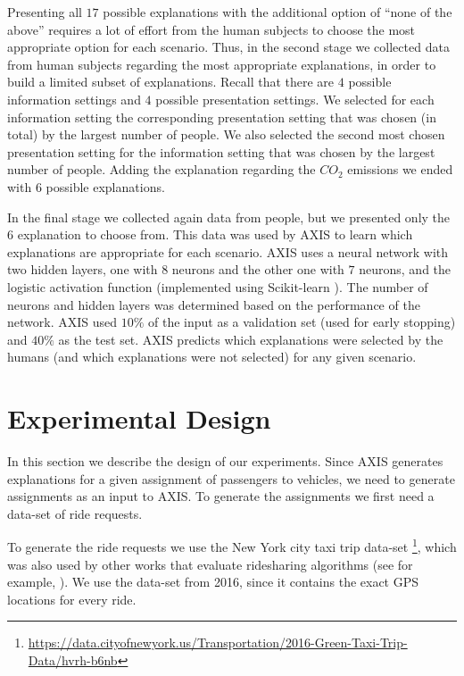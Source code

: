 \documentclass[letterpaper]{article} %
\begin{document}
Presenting all $17$ possible explanations with the additional option of ``none of the above'' requires a lot of effort from the human subjects to choose the most appropriate option for each scenario. Thus, in the second stage we collected data from human subjects regarding the most appropriate explanations, in order to build a limited subset of explanations. Recall that there are $4$ possible information settings and $4$ possible presentation settings. We selected for each information setting the corresponding presentation setting that was chosen (in total) by the largest number of people. We also selected the second most chosen presentation setting for the information setting that was chosen by the largest number of people. Adding the explanation regarding the $CO_2$ emissions we ended with $6$ possible explanations.

In the final stage we collected again data from people, but we presented only the $6$ explanation to choose from. This data was used by AXIS to learn which explanations are appropriate for each scenario. AXIS uses a neural network with two hidden layers, one with $8$ neurons and the other one with $7$ neurons, and the logistic activation function (implemented using Scikit-learn \cite{scikit-learn}). The number of neurons and hidden layers was determined based on the performance of the network.
AXIS used $10\%$ of the input as a validation set (used for early stopping) and $40\%$ as the test set. AXIS predicts which explanations were selected by the humans (and which explanations were not selected) for any given scenario.



\section{Experimental Design}
In this section we describe the design of our experiments. Since AXIS generates explanations for a given assignment of passengers to vehicles, we need to generate assignments as an input to AXIS. To generate the assignments we first need a data-set of ride requests.

To generate the ride requests we use the New York city taxi trip data-set \footnote{\url{https://data.cityofnewyork.us/Transportation/2016-Green-Taxi-Trip-Data/hvrh-b6nb}}, which was also used by other works that evaluate ridesharing algorithms (see for example, \cite{lin2016model,biswas2017profit}). We use the data-set from 2016, since it contains the exact GPS locations for every ride. %
\end{document}
